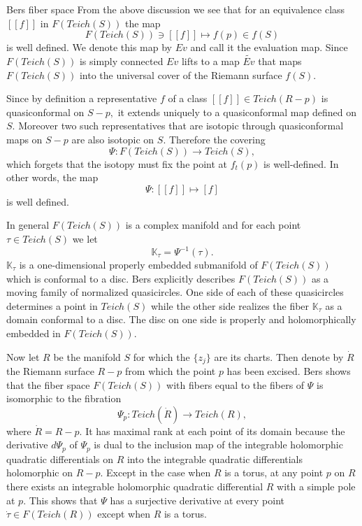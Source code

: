 \documentclass[12pt]{amsart}
\theoremstyle{remark}
\theoremstyle{definition}
\theoremstyle{definition}
\begin{document}
\begin{section}{Bers fiber space}
From the above discussion we see that for an equivalence class $[[f]]$ in $F(Teich(S))$  the map $$F(Teich(S)) \ni [[f]] \mapsto f(p) \in f(S)$$ is well defined. We denote this map by $Ev$ and call it the evaluation map.  
Since $F(Teich(S))$ is simply connected $Ev$
   lifts to a map $\widetilde{Ev}$ that maps $F(Teich(S))$ into the universal cover of the Riemann surface $f(S).$  

   
   
Since by definition a representative $f$ of a class $[[f]] \in Teich(R-p)$ is quasiconformal on $S-p,$ it extends uniquely to a quasiconformal map defined on $S.$  Moreover two such representatives that are isotopic through quasiconformal maps on $S-p$ are also isotopic on $S.$ Therefore the covering
 $$\Psi:F(Teich(S)) \rightarrow Teich(S),$$
   which forgets that the isotopy must fix the point at $f_t(p)$  is well-defined.  In other words, the map $$\Psi: [[f]] \mapsto [f]$$ 
   is well defined.


In general $F(Teich(S))$ is a complex manifold and for each point $\tau \in Teich(S)$ we let 
\begin{equation}\label{Ktau}
{\mathbb K}_{\tau}=\Psi^{-1}(\tau).
\end{equation}
${\mathbb K}_{\tau}$ is a one-dimensional properly embedded submanifold of $F(Teich(S))$ which is conformal to a disc.  Bers explicitly describes $F(Teich(S))$ as a moving family of normalized quasicircles.  One side of each of these quasicircles determines a point in $Teich(S)$ while the other side realizes the fiber ${\mathbb K}_{\tau}$ as a domain conformal to a disc.  The disc on one side is properly and holomorphically embedded in $F(Teich(S)).$  

Now let $R$ be the manifold $S$ for which the $\{z_j\}$ are its charts. Then denote by $\dot{R}$ the Riemann surface $R-p$ from which the point $p$ has been excised. Bers shows that the fiber space $F(Teich(S))$ with fibers equal to the fibers of  $\Psi$ is isomorphic to the fibration 
$$\Psi_p: Teich(\dot{R}) \rightarrow Teich(R),$$
where $\dot{R}=R-p.$ 
It has maximal rank at each point of its domain because
  the derivative $d\Psi_p$  of $\Psi_p$ is dual to the inclusion map of the integrable holomorphic quadratic differentials on $R$ into the integrable quadratic differentials holomorphic on $R-p.$   Except in the case when $R$ is a torus, at any point $p$ on $R$ there exists an integrable holomorphic quadratic differential $R$ with a simple pole at $p.$ This  shows that $\Psi$ has a surjective derivative at every point $\dot{\tau} \in F(Teich(R))$ except when $R$ is a torus.  



\end{section}
\end{document}
